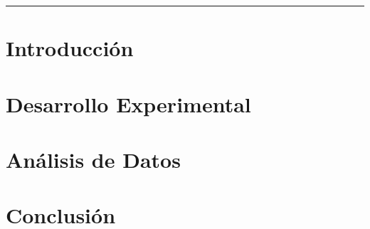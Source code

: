 \documentclass[a4paper, 10pt]{article}
\begin{document}
\vspace{10pt}

\noindent\hrule
\section{Introducción}

    \begin{multicols}{2}

    \end{multicols}

\section{Desarrollo Experimental}

    \begin{multicols}{2}

    \end{multicols}

\section{Análisis de Datos}

    \begin{multicols}{2}

    \end{multicols}

\section{Conclusión}

    \begin{multicols}{2}

    \end{multicols}
\end{document}
